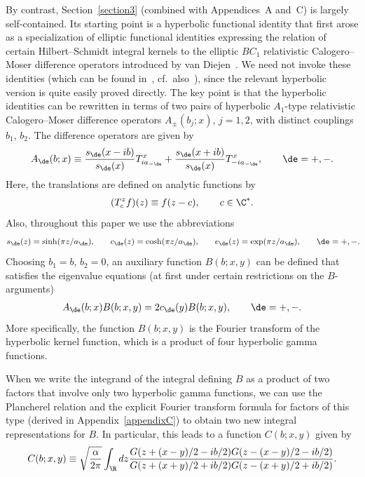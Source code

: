 \documentclass[pdftex]{sigma}
\numberwithin{equation}{section}
\begin{document}
By contrast, Section~\ref{section3} (combined with Appendices~A and~C) is largely self-contained. Its starting point is a hyperbolic functional identity that f\/irst arose as a specialization of elliptic functional identities expressing the relation of certain Hilbert--Schmidt integral kernels to the elliptic $BC_1$ relativistic Calogero--Moser dif\/ference operators introduced by van Diejen~\cite{diej}. We need not invoke these identities (which can be found in~\cite{HSI}, cf.~also~\cite{noum}), since the relevant hyperbolic version is quite easily proved directly. The key point is that the hyperbolic identities can be rewritten in terms of two pairs of hyperbolic $A_1$-type relativistic Calogero--Moser dif\/fe\-rence operators $A_{\pm}(b_j;x)$, $j=1,2$, with distinct couplings $b_1$, $b_2$. The dif\/ference operators are given by
\begin{gather}\label{Apm}
A_{\de}(b;x)\equiv \frac{s_{\de}(x-ib)}{s_{\de}(x)}T^x_{ia_{-\de}}+\frac{s_{\de}(x+ib)}{s_{\de}(x)}T^x_{-ia_{-\de}},\qquad \de=+,-.
\end{gather}
Here, the translations are def\/ined on analytic functions by
\begin{gather}\label{Tdef}
(T^z_cf)(z)\equiv f(z-c),\qquad c\in\C^{*}.
\end{gather}
Also, throughout this paper we use the abbreviations
\begin{gather}\label{denot}
s_{\de}(z)=\sinh(\pi z/a_{\de}),\! \qquad c_{\de}(z)=\cosh(\pi z/a_{\de}),\! \qquad e_{\de}(z)=\exp(\pi z/a_{\de}),\! \qquad \de=+,-.\!\!
\end{gather}
Choosing $b_1=b$, $b_2=0$, an auxiliary function $B(b;x,y)$ can be def\/ined that satisf\/ies the eigenvalue equations (at f\/irst under certain restrictions on the $B$-arguments)
\begin{gather}\label{AdeB}
A_{\de}(b;x)B(b;x,y)=2c_{\de}(y)B(b;x,y),\qquad \de=+,-.
\end{gather}
 More specif\/ically, the function $B(b;x,y)$ is the Fourier transform of the hyperbolic kernel function, which is a product of four hyperbolic gamma functions.

When we write the integrand of the integral def\/ining $B$ as a product of two factors that involve only two hyperbolic gamma functions, we can use the Plancherel relation and the explicit Fourier transform formula for factors of this type (derived in Appendix~\ref{appendixC}) to obtain two new integral representations for $B$.  In particular, this leads to a function $C(b;x,y)$ given by
\begin{gather}\label{defC}
C(b;x,y)\equiv \sqrt{\frac{\alpha}{2\pi}}\int_{\R}dz \frac{G(z+ (x-y)/2-ib/2)G(z- (x-y)/2-ib/2)}{G(z+ (x+y)/2+ib/2)G(z- (x+y)/2+ib/2)}.
\end{gather}
\end{document}
